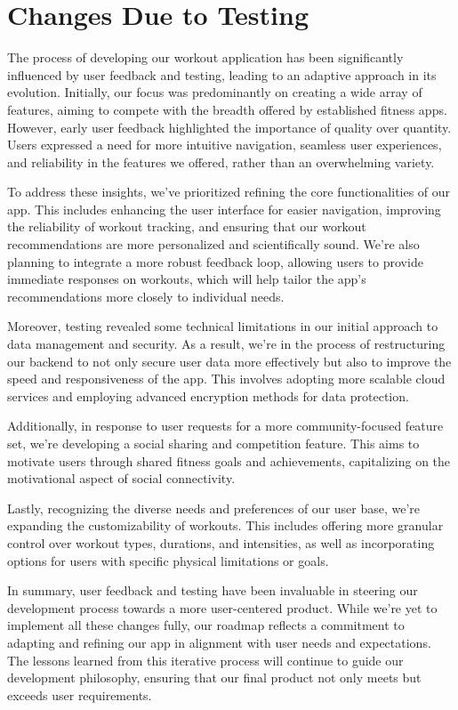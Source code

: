 \documentclass[12pt, titlepage]{article}
\begin{document}
\section{Changes Due to Testing}

The process of developing our workout application has been significantly influenced by user feedback and testing, leading to an adaptive approach in its evolution. Initially, our focus was predominantly on creating a wide array of features, aiming to compete with the breadth offered by established fitness apps. However, early user feedback highlighted the importance of quality over quantity. Users expressed a need for more intuitive navigation, seamless user experiences, and reliability in the features we offered, rather than an overwhelming variety.

To address these insights, we've prioritized refining the core functionalities of our app. This includes enhancing the user interface for easier navigation, improving the reliability of workout tracking, and ensuring that our workout recommendations are more personalized and scientifically sound. We're also planning to integrate a more robust feedback loop, allowing users to provide immediate responses on workouts, which will help tailor the app's recommendations more closely to individual needs.

Moreover, testing revealed some technical limitations in our initial approach to data management and security. As a result, we're in the process of restructuring our backend to not only secure user data more effectively but also to improve the speed and responsiveness of the app. This involves adopting more scalable cloud services and employing advanced encryption methods for data protection.

Additionally, in response to user requests for a more community-focused feature set, we're developing a social sharing and competition feature. This aims to motivate users through shared fitness goals and achievements, capitalizing on the motivational aspect of social connectivity.

Lastly, recognizing the diverse needs and preferences of our user base, we're expanding the customizability of workouts. This includes offering more granular control over workout types, durations, and intensities, as well as incorporating options for users with specific physical limitations or goals.

In summary, user feedback and testing have been invaluable in steering our development process towards a more user-centered product. While we're yet to implement all these changes fully, our roadmap reflects a commitment to adapting and refining our app in alignment with user needs and expectations. The lessons learned from this iterative process will continue to guide our development philosophy, ensuring that our final product not only meets but exceeds user requirements.
\end{document}
